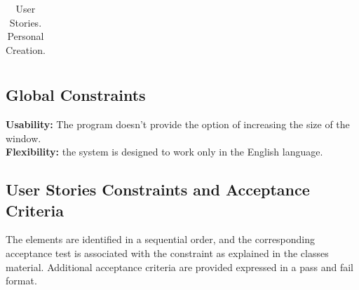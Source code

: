 \documentclass{report}
\begin{document}
\begin{table}[H]
\begin{tabular}{ | m{2.7em} | m{8cm}| m{1.8cm} | m{1.5cm} | m{1.5cm} | m{1.5cm} |}
\hline
\end{tabular}
\caption[User Stories]{User Stories. Personal Creation.}
\label{table:1}
\end{table}


\subsection{Global Constraints} 

\textbf{Usability:} The program doesn't provide the option of increasing the size of the window.\\
\textbf{Flexibility:} the system is designed to work only in the English language.

\subsection{User Stories Constraints and Acceptance Criteria}

The elements are identified in a sequential order, and the corresponding acceptance test is associated with the constraint as explained in the classes material. Additional acceptance criteria are provided expressed in a pass and fail format.

\newpage
\end{document}
